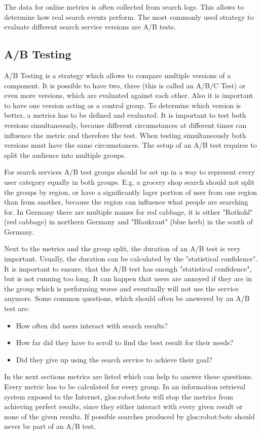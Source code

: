 The data for online metrics is often collected from search logs.
This allows to determine how real search events perform.
The most commonly used strategy to evaluate different search service versions are A/B tests.
		
\subsection{A/B Testing}
A/B Testing is a strategy which allows to compare multiple versions of a component.
It is possible to have two, three (this is called an A/B/C Test) or even more versions, which are evaluated against each other.
Also it is important to have one version acting as a control group.
To determine which version is better, a metrics has to be defined and evaluated.
It is important to test both versions simultaneously, 
because different circumstances at different times can influence the metric and therefore the test.
When testing simultaneously both versions must have the same circumstances.
The setup of an A/B test requires to split the audience into multiple groups\cite{chopra_2010}.
\par
For search services A/B test groups should be set up in a way to represent every user category equally in both groups.
E.g. a grocery shop search should not split the groups by region, or have a significantly lager portion of user from one region than from another,
because the region can influence what people are searching for. 
In Germany there are multiple names for red cabbage, it is either "Rotkohl" (red cabbage) in northern Germany and "Blaukraut" (blue herb) in the south of Germany.
\par
Next to the metrics and the group split, the duration of an A/B test is very important.
Usually, the duration can be calculated by the "statistical confidence".
It is important to ensure, that the A/B test has enough "statistical confidence", but is not running too long. 
It can happen that users are annoyed if they are in the group which is performing worse and eventually will not use the service anymore. 
Some common questions, which should often be answered by an A/B test are:
\begin{itemize}
	\item How often did users interact with search results?
	\item How far did they have to scroll to find the best result for their needs?
	\item Did they give up using the search service to achieve their goal?
\end{itemize}
In the next sections metrics are listed which can help to answer these questions.
Every metric has to be calculated for every group.
In an information retrieval system exposed to the Internet, 
\glspl{glos:robot:bot} will stop the metrics from achieving perfect results,
since they either interact with every given result or none of the given results.
If possible searches produced by \glspl{glos:robot:bot} should never be part of an A/B test.
		
